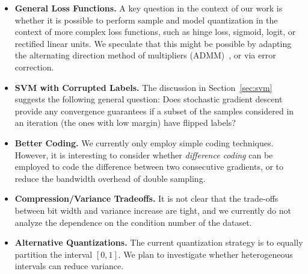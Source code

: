 \documentclass{article}
\begin{document}
\begin{itemize}
	\item {\bf General Loss Functions.} 
	A key question in the context of our work is whether it is possible to perform sample and model quantization 
	in the context of more complex loss functions, such as hinge loss, sigmoid, logit, or rectified linear units. 
	We speculate that this might be possible by adapting the alternating direction method of multipliers (ADMM)~\cite{ADMM}, 
	or via error correction.  
	
	\item {\bf SVM with Corrupted Labels.}  
	The discussion in Section~\ref{sec:svm} suggests the following general question: 
	Does stochastic gradient descent provide any convergence guarantees if a subset of the samples considered in an iteration (the ones with low margin) have flipped labels?
	
	\item {\bf Better Coding.}  
	We currently only employ simple coding techniques. However, it is interesting to consider whether \emph{difference coding} can be employed to code the difference between two consecutive gradients, or to reduce the bandwidth overhead of double sampling.  

    \item {\bf Compression/Variance Tradeoffs.} It is not clear that the trade-offs between bit width and variance increase are tight, and we currently do not analyze the dependence on the condition number of the dataset. 
    
    \item {\bf Alternative Quantizations.} The current quantization strategy is to equally partition the interval $[0, 1]$. 
    We plan to investigate whether heterogeneous intervals can reduce variance.
    
    
    
\end{itemize}


\fi
\end{document}

